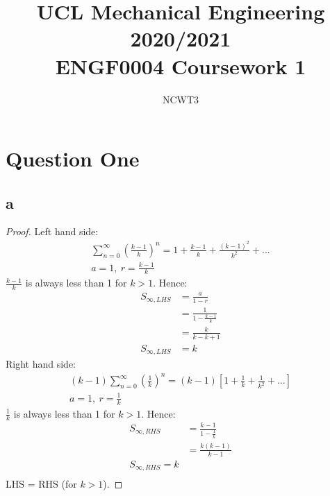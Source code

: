 \documentclass[11pt]{article}
\numberwithin{equation}{section}
\begin{document}
\title{\textbf{UCL Mechanical Engineering 2020/2021}\\ENGF0004 Coursework 1}
\author{NCWT3}
\maketitle
\section{Question One}
\subsection*{a}
\begin{proof}
Left hand side:
\begin{gather}
	\sum_{n=0}^{\infty} \left(\frac{k-1}{k}\right)^n = 1 + \frac{k-1}{k} + \frac{\left(k-1\right)^2}{k^2} + ...\\
	a= 1, \ r = \frac{k-1}{k}
\end{gather}
$\frac{k-1}{k}$ is always less than 1 for $k > 1$. Hence:
\begin{align}
	S_{\infty, LHS} &= \frac{a}{1-r}\\
	&= \frac{1}{1-\frac{k-1}{k}}\\
	&= \frac{k}{k-k+1}\\
	S_{\infty, LHS} &= k
\end{align}
Right hand side:
\begin{gather}
	\left(k-1\right) \sum_{n=0}^{\infty} \left(\frac{1}{k}\right)^n = \left(k-1\right) \left[1 + \frac{1}{k} + \frac{1}{k^2} + ...\right]\\
	a = 1, \ r = \frac{1}{k}
\end{gather}
$\frac{1}{k}$ is always less than 1 for $k > 1$. Hence:
\begin{align}
	S_{\infty,RHS} &= \frac{k-1}{1 - \frac{1}{k}}\\
	&= \frac{k\left(k-1\right)}{k-1}\\
	S_{\infty,RHS} = k\\
\end{align}
LHS = RHS (for $k > 1$).
\end{proof}
\end{document}
